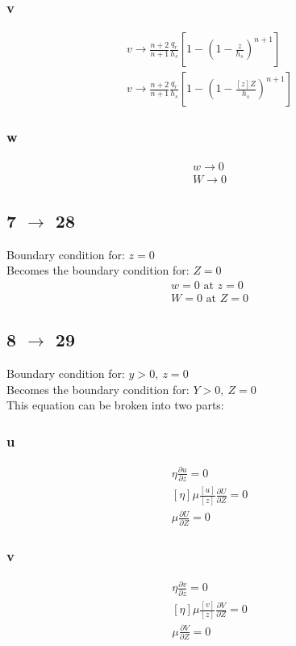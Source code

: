 \documentclass[10pt, letterpaper, twoside]{article}
\newcommand{\pd}[2]{\frac{\partial#1}{\partial#2}}
\begin{document}
	\subsubsection{v}
	\begin{gather*}
		v \rightarrow \frac{n+2}{n+1}\frac{q_r}{h_s}\left[1-\left(1-\frac{z}{h_s}\right)^{n+1}\right] \tag{6b} \\
		v \rightarrow \frac{n+2}{n+1}\frac{q_r}{h_s}\left[1-\left(1-\frac{\left[z\right]Z}{h_s}\right)^{n+1}\right] \tag{6b'}
	\end{gather*}
	\subsubsection{w}
	\begin{gather*}
		w \rightarrow 0 \tag{6c} \\
		W \rightarrow 0 \tag{26c}
	\end{gather*}
	\subsection{7 $ \rightarrow $ 28}
	Boundary condition for: $ z = 0 $\\
	Becomes the boundary condition for: $ Z = 0 $
	\begin{gather*}
		w = 0 \text{ at } z = 0 \tag{7} \\
		W = 0 \text{ at } Z = 0 \tag{28}
	\end{gather*}
	\subsection{8 $ \rightarrow $ 29}
	Boundary condition for: $ y > 0,\ z = 0 $\\
	Becomes the boundary condition for: $ Y > 0,\ Z = 0 $\\
	This equation can be broken into two parts:
	\subsubsection{u}
	\begin{gather*}
		\eta\pd{u}{z} = 0 \tag{8a} \\
		\left[\eta\right]\mu\frac{\left[u\right]}{\left[z\right]}\pd{U}{Z} = 0\\
		\mu\pd{U}{Z} = 0 \tag{29a}
	\end{gather*}
	\subsubsection{v}
	\begin{gather*}
		\eta\pd{v}{z} = 0 \tag{8b} \\
		\left[\eta\right]\mu\frac{\left[v\right]}{\left[z\right]}\pd{V}{Z} = 0\\
		\mu\pd{V}{Z} = 0 \tag{29b}
	\end{gather*}
\end{document}
